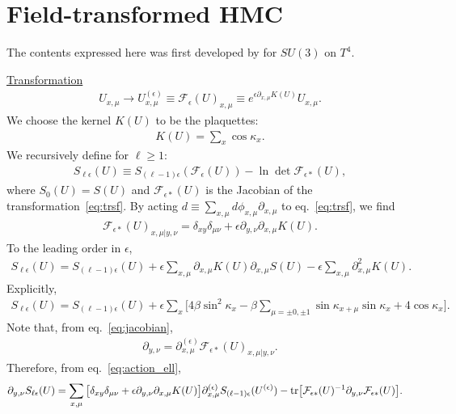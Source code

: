 \documentclass[12pt]{article}
\begin{document}
\section{Field-transformed HMC}
\label{sec:ft-hmc}

The contents expressed here was
first developed by \cite{Luscher:2009eq} for $SU(3)$ on $T^4$.

\noindent \underline{Transformation}
\begin{align}
  U_{x,\mu} \to U_{x,\mu}^{(\epsilon)} \equiv \mathcal{F}_\epsilon(U)_{x,\mu}
  \equiv
  e^{\epsilon \partial_{x,\mu} K(U)} U_{x,\mu}.
  \label{eq:trsf}
\end{align}
We choose the kernel $K(U)$ to be the plaquettes:
\begin{align}
  K(U) = \sum_{x} \cos\kappa_{x}.
  \label{eq:tilde_s}
\end{align}
We recursively define for $\ell \geq 1$:
\begin{align}
  S_{\ell\epsilon}(U) \equiv
  S_{(\ell-1)\epsilon} (\mathcal{F}_\epsilon(U))
  - \ln \det \mathcal{F}_{\epsilon*}(U),
  \label{eq:action_ell}
\end{align}
where $S_0(U)=S(U)$
and $\mathcal{F}_{\epsilon *}(U)$ is
the Jacobian of the transformation~\eqref{eq:trsf}.
By acting
$d\equiv \sum_{x,\mu}d\phi_{x,\mu} \partial_{x,\mu}$
to eq.~\eqref{eq:trsf}, we find
\begin{align}
  \mathcal{F}_{\epsilon *}(U)_{x,\mu|y,\nu}
  =\delta_{xy}\delta_{\mu\nu}
  + \epsilon \partial_{y,\nu} \partial_{x,\mu} K(U).
  \label{eq:jacobian}
\end{align}
To the leading order in $\epsilon$,
\begin{align}
  S_{\ell\epsilon}(U) =
  S_{(\ell-1)\epsilon}(U)
  +
  \epsilon \sum_{x,\mu}
  \partial_{x,\mu}K(U) \partial_{x,\mu}S(U)
  -
  \epsilon \sum_{x,\mu}
  \partial_{x,\mu}^2 K(U).
\end{align}
Explicitly,
\begin{align}
  S_{\ell\epsilon}(U)
  =
  S_{(\ell-1)\epsilon}(U) + \epsilon \sum_{x} \Big[
  4 \beta \sin^2\kappa_x
  - \beta \sum_{\mu=\pm 0,\pm1} \sin\kappa_{x+\mu} \sin \kappa_x
  + 4 \cos\kappa_x
  \Big].
\end{align}
Note that, from eq.~\eqref{eq:jacobian},
\begin{align}
  \partial_{y,\nu}
  =\partial_{x,\mu}^{(\epsilon)}
  \mathcal{F}_{\epsilon *}(U)_{x,\mu|y,\nu}.
  \label{eq:deriv_law}
\end{align}
Therefore, from eq.~\eqref{eq:action_ell},
\begin{align}
  \partial_{y,\nu} S_{\ell \epsilon}(U)
  &=
    \sum_{x,\mu}
    \big[\delta_{xy}\delta_{\mu\nu}
    + \epsilon \partial_{y,\nu} \partial_{x,\mu}
    K(U)
    \big]
    \partial_{x,\mu}^{(\epsilon)}
    S_{(\ell-1) \epsilon}(U^{(\epsilon)}) 
    - {\rm tr} \big[\mathcal{F}_{\epsilon *}(U)^{-1}
    \partial_{y,\nu} \mathcal{F}_{\epsilon *}(U) \big].
    \label{eq:force_prop2}
\end{align}
\end{document}
